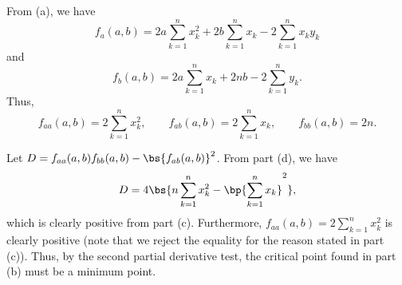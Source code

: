 \begin{solution}
\begin{ppart}
    \end{ppart}
    \begin{ppart}
        From (a), we have \[f_a(a, b) = 2a \sum_{k = 1}^n x_k^2 + 2b \sum_{k = 1}^n x_k - 2\sum_{k = 1}^n x_k y_k\] and \[f_b(a, b) = 2a\sum_{k = 1}^n x_k + 2nb - 2\sum_{k = 1}^n y_k.\] Thus, \[f_{aa}(a, b) = 2 \sum_{k = 1}^n x_k^2, \qquad f_{ab}(a, b) = 2 \sum_{k = 1}^n x_k, \qquad f_{bb}(a, b) = 2n.\]
    \end{ppart}
    \begin{ppart}
        Let $D = f_{aa}(a, b) f_{bb}(a, b) - \bs{f_{ab}(a, b)}^2$. From part (d), we have \[D = 4\bs{n\sum_{k = 1}^n x_k^2 - \bp{\sum_{k = 1}^n x_k}^2},\] which is clearly positive from part (c). Furthermore, $f_{aa}(a, b) =  2 \sum_{k = 1}^n x_k^2$ is clearly positive (note that we reject the equality for the reason stated in part (c)). Thus, by the second partial derivative test, the critical point found in part (b) must be a minimum point.
    \end{ppart}
\end{solution}